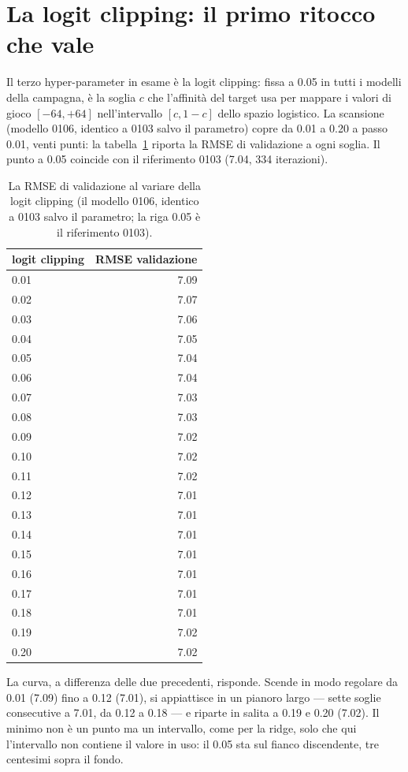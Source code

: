 \section{La logit clipping: il primo ritocco che vale}

Il terzo hyper-parameter in esame è la logit clipping: fissa a 0.05
in tutti i modelli della campagna, è la soglia $c$ che l'affinità del
target usa per mappare i valori di gioco $[-64, +64]$ nell'intervallo
$[c, 1-c]$ dello spazio logistico. La scansione (modello 0106,
identico a 0103 salvo il parametro) copre da 0.01 a 0.20 a passo
0.01, venti punti: la tabella~\ref{tab:logit-curva} riporta la RMSE
di validazione a ogni soglia. Il punto a 0.05 coincide con il
riferimento 0103 (7.04, 334 iterazioni).

\begin{table}[ht]
\centering
\begin{tabular}{lr}
\toprule
logit clipping & RMSE validazione \\
\midrule
0.01 & 7.09 \\
0.02 & 7.07 \\
0.03 & 7.06 \\
0.04 & 7.05 \\
0.05 & 7.04 \\
0.06 & 7.04 \\
0.07 & 7.03 \\
0.08 & 7.03 \\
0.09 & 7.02 \\
0.10 & 7.02 \\
0.11 & 7.02 \\
0.12 & 7.01 \\
0.13 & 7.01 \\
0.14 & 7.01 \\
0.15 & 7.01 \\
0.16 & 7.01 \\
0.17 & 7.01 \\
0.18 & 7.01 \\
0.19 & 7.02 \\
0.20 & 7.02 \\
\bottomrule
\end{tabular}
\caption{La RMSE di validazione al variare della logit clipping (il
modello 0106, identico a 0103 salvo il parametro; la riga 0.05 è il
riferimento 0103).}
\label{tab:logit-curva}
\end{table}

La curva, a differenza delle due precedenti, risponde. Scende in
modo regolare da 0.01 (7.09) fino a 0.12 (7.01), si appiattisce in
un pianoro largo — sette soglie consecutive a 7.01, da 0.12 a 0.18 —
e riparte in salita a 0.19 e 0.20 (7.02). Il minimo non è un punto
ma un intervallo, come per la ridge, solo che qui l'intervallo non
contiene il valore in uso: il 0.05 sta sul fianco discendente, tre
centesimi sopra il fondo.

